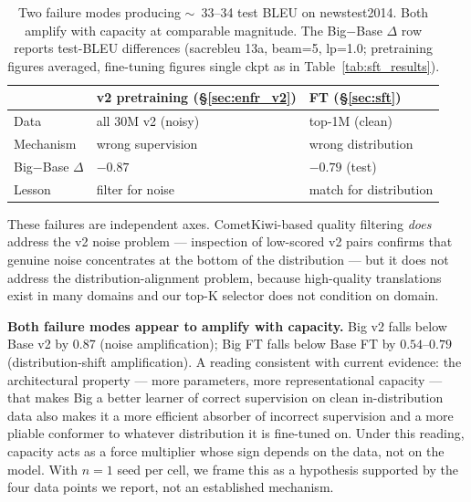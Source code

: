 \begin{table}[t]
\centering
\small
\begin{tabular}{p{2.4cm} p{2.4cm} p{2.4cm}}
\toprule
& v2 pretraining (\S\ref{sec:enfr_v2}) & FT (\S\ref{sec:sft}) \\
\midrule
Data & all 30M v2 (noisy) & top-1M (clean) \\
Mechanism & wrong supervision & wrong distribution \\
Big$-$Base $\Delta$ & $-0.87$ & $-0.79$ (test) \\
Lesson & filter for noise & match for distribution \\
\bottomrule
\end{tabular}
\caption{Two failure modes producing $\sim$~33--34 test BLEU on newstest2014. Both amplify with capacity at comparable magnitude. The Big$-$Base $\Delta$ row reports test-BLEU differences (sacrebleu 13a, beam=5, lp=1.0; pretraining figures averaged, fine-tuning figures single ckpt as in Table~\ref{tab:sft_results}).}
\label{tab:two_failures}
\end{table}

These failures are independent axes. CometKiwi-based quality filtering \emph{does} address the v2 noise problem --- inspection of low-scored v2 pairs confirms that genuine noise concentrates at the bottom of the distribution --- but it does not address the distribution-alignment problem, because high-quality translations exist in many domains and our top-K selector does not condition on domain.

\textbf{Both failure modes appear to amplify with capacity.} Big v2 falls below Base v2 by 0.87 (noise amplification); Big FT falls below Base FT by $0.54$--$0.79$ (distribution-shift amplification). A reading consistent with current evidence: the architectural property --- more parameters, more representational capacity --- that makes Big a better learner of correct supervision on clean in-distribution data also makes it a more efficient absorber of incorrect supervision and a more pliable conformer to whatever distribution it is fine-tuned on. Under this reading, capacity acts as a force multiplier whose sign depends on the data, not on the model. With $n{=}1$ seed per cell, we frame this as a hypothesis supported by the four data points we report, not an established mechanism.

